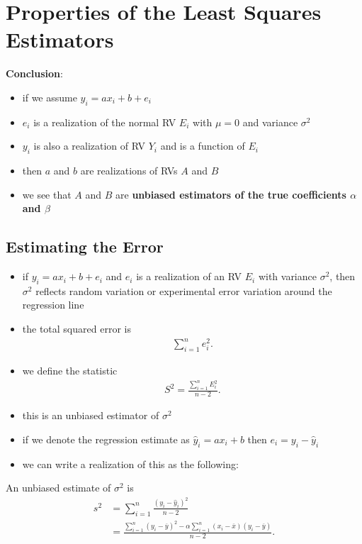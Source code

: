 \documentclass[10pt]{article}
\begin{document}
\section{Properties of the Least Squares Estimators}
\textbf{Conclusion}:
\begin{itemize}
    \item if we assume $y_i=ax_i + b + e_i$
    \item $e_i$ is a realization of the normal RV $E_i$ with $\mu=0$ and variance $\sigma^2$ 
    \item $y_i$ is also a realization of RV $Y_i$ and is a function of $E_i$ 
    \item then $a$ and $b$ are realizations of RVs $A$ and $B$ 
    \item we see that $A$ and $B$ are \textbf{unbiased estimators of the true coefficients $\alpha$ and $\beta$} 
\end{itemize}

\subsection{Estimating the Error}
\begin{itemize}
    \item if $y_i = ax_i+b+e_i$ and $e_i$ is a realization of an RV $E_i$ with variance $\sigma^2$, then $\sigma^2$ reflects random variation or experimental error variation around the regression line
    \item the total squared error is 
        \begin{gather*}
            \sum_{i=1}^{n} e_i^2
        .\end{gather*}
    \item we define the statistic 
        \begin{gather*}
            S^2 = \frac{\sum_{i=1}^{n} E_i^2}{n-2}
        .\end{gather*}
    \item this is an unbiased estimator of $\sigma^2$ 
    \item if we denote the regression estimate as $\hat{y}_i = ax_i + b$ then $e_i = y_i - \hat{y}_i$
    \item we can write a realization of this as the following:
\end{itemize}
\begin{theorem}
    An unbiased estimate of $\sigma^2$ is 
    \begin{align*}
        s^2 &= \sum_{i=1}^{n} \frac{(y_i - \hat{y}_i)^2}{n-2} \\ 
            &= \frac{\sum_{i=1}^{n} (y_i - \overline{y})^2 - \alpha \sum_{i=1}^{n} (x_i-\overline{x})(y_i-\overline{y})}{n-2}
    .\end{align*}
\end{theorem}
\end{document}
